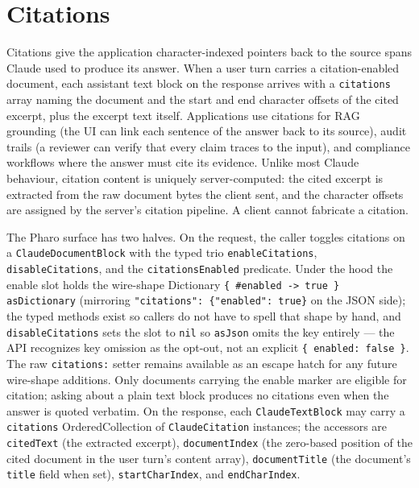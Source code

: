 \documentclass[a4paper,10pt,fleqn]{article}
\begin{document}
\medskip
\begin{sloppypar}
\end{sloppypar}

\section{Citations}
\label{sec:citations}

Citations give the application character-indexed pointers back to
the source spans Claude used to produce its answer.  When a user
turn carries a citation-enabled document, each assistant text block
on the response arrives with a \texttt{citations} array naming the
document and the start and end character offsets of the cited
excerpt, plus the excerpt text itself.  Applications use citations
for RAG grounding (the UI can link each sentence of the answer back
to its source), audit trails (a reviewer can verify that every
claim traces to the input), and compliance workflows where the
answer must cite its evidence.  Unlike most Claude behaviour,
citation content is uniquely server-computed: the cited excerpt is
extracted from the raw document bytes the client sent, and the
character offsets are assigned by the server's citation pipeline.
A client cannot fabricate a citation.

\begin{sloppypar}
The Pharo surface has two halves.  On the request, the caller
toggles citations on a \texttt{ClaudeDocumentBlock} with the typed
trio \texttt{enableCitations}, \texttt{disableCitations}, and the
\texttt{citationsEnabled} predicate.  Under the hood the enable
slot holds the wire-shape Dictionary
\texttt{\{ \#enabled -> true \} asDictionary} (mirroring
\texttt{"citations": \{"enabled": true\}} on the JSON side); the
typed methods exist so callers do not have to spell that shape by
hand, and \texttt{disableCitations} sets the slot to \texttt{nil}
so \texttt{asJson} omits the key entirely --- the API recognizes
key omission as the opt-out, not an explicit
\texttt{\{ enabled: false \}}.  The raw \texttt{citations:} setter
remains available as an escape hatch for any future wire-shape
additions.  Only documents carrying the enable marker are eligible
for citation; asking about a plain text block produces no
citations even when the answer is quoted verbatim.  On the
response, each \texttt{ClaudeTextBlock} may carry a
\texttt{citations} OrderedCollection of \texttt{ClaudeCitation}
instances; the accessors are \texttt{citedText} (the extracted
excerpt), \texttt{documentIndex} (the zero-based position of the
cited document in the user turn's content array),
\texttt{documentTitle} (the document's \texttt{title} field when
set), \texttt{startCharIndex}, and \texttt{endCharIndex}.
\end{sloppypar}
\end{document}
